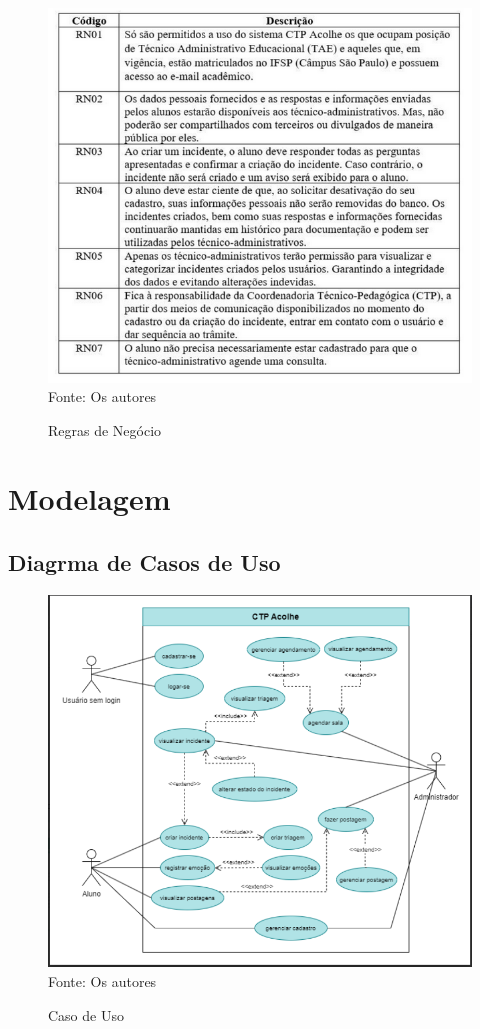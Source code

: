 \documentclass[12pt,a4paper]{article}
\begin{document}
\begin{figure}[H]
    \centering
    \caption{Regras de Negócio}
     \includegraphics[width=15cm]{img8.png}
    Fonte: Os autores
    \label{p1}
\end{figure}

\newpage

\section{Modelagem}
\subsection{Diagrma de Casos de Uso}
\begin{figure}[H]
    \centering
    \caption{Caso de Uso}
     \includegraphics[width=15cm]{casouso.png}
     Fonte: Os autores
     \label{casouso}
\end{figure}
\end{document}
